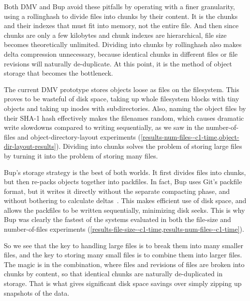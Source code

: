 Both \gls{DMV} and Bup avoid these pitfalls by operating with a finer
granularity, using a \gls{rollinghash} to divide files into chunks by their
content. It is the chunks and their indexes that must fit into memory, not the
entire file. And then since chunks are only a few kilobytes and chunk indexes
are hierarchical, file size becomes theoretically unlimited. Dividing into
chunks by \gls{rollinghash} also makes delta compression unnecessary, because
identical chunks in different files or file revisions will naturally
de-duplicate. At this point, it is the method of object storage that becomes the
bottleneck.

The current \gls{DMV} prototype stores objects loose as files on the filesystem.
This proves to be wasteful of disk space, taking up whole filesystem blocks with
tiny objects and taking up \glspl{inode} with subdirectories. Also, naming the
object files by their SHA-1 hash effectively makes the filenames random, which
causes dramatic write slowdowns compared to writing sequentially, as we saw in
the number-of-files and object-directory-layout experiments
(\cref{results-num-files--c1-time,object-dir-layout-results}). Dividing into
chunks solves the problem of storing large files by turning it into the problem
of storing many files.

Bup's storage strategy is the best of both worlds. It first divides files into
chunks, but then re-packs objects together into \glspl{packfile}. In fact, Bup
uses Git's \gls{packfile} format\footnotemark, but it writes it directly without
the separate compacting phase, and without bothering to calculate
deltas~\cite{bup_design}. This makes efficient use of disk space, and allows the
\glspl{packfile} to be written sequentially, minimizing disk seeks. This is why
Bup was clearly the fastest of the systems evaluated in both the file-size and
number-of-files experiments
(\cref{results-file-size--c1-time,results-num-files--c1-time}).


So we see that the key to handling large files is to break them into many
smaller files, and the key to storing many small files is to combine them into
larger files. The magic is in the combination, where files and revisions of
files are broken into chunks by content, so that identical chunks are naturally
de-duplicated in storage. That is what gives significant disk space savings over
simply zipping up snapshots of the data.

